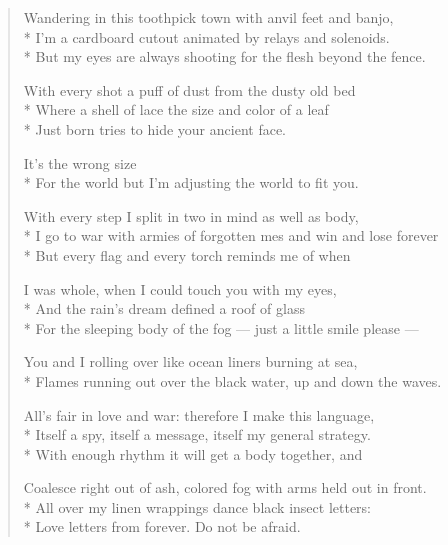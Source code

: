 \documentclass[english,11pt,letterpaper,onecolumn]{scrbook}
\begin{document}
\newpage
{}

\begin{verse}

Wandering in this toothpick town with anvil feet and banjo, \\*
I'm a cardboard cutout animated by relays and solenoids. \\*
But my eyes are always shooting for the flesh beyond the fence.



With every shot a puff of dust from the dusty old bed \\*
Where a shell of lace the size and color of a leaf \\*
Just born tries to hide your ancient face.



It's the wrong size \\*
For the world but I'm adjusting the world to fit you.



With every step I split in two in mind as well as body, \\*
I go to war with armies of forgotten mes and win and lose forever \\*
But every flag and every torch reminds me of when



I was whole, when I could touch you with my eyes, \\*
And the rain's dream defined a roof of glass \\*
For the sleeping body of the fog --- just a little smile please ---



You and I rolling over like ocean liners burning at sea, \\*
Flames running out over the black water, up and down the waves.



All's fair in love and war:  therefore I make this language, \\*
Itself a spy, itself a message, itself my general strategy. \\*
With enough rhythm it will get a body together, and



Coalesce right out of ash, colored fog with arms held out in front. \\*
All over my linen wrappings dance black insect letters: \\*
Love letters from forever.  Do not be afraid.




\end{verse}
\end{document}
